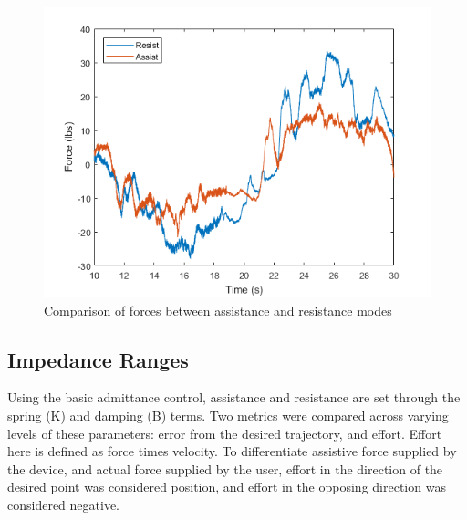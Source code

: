 \documentclass[12pt]{report}
\begin{document}
\begin{figure}[t] 
	\centering
	\includegraphics[width=0.9\linewidth]{force_comp}
	\caption{Comparison of forces between assistance and resistance modes}
	\label{fig:VerInt}
\end{figure}
	

	
	\subsection{Impedance Ranges}
	
	Using the basic admittance control, assistance and resistance are set through the spring (K) and damping (B) terms. Two metrics were compared across varying levels of these parameters: error from the desired trajectory, and effort. Effort here is defined as force times velocity. To differentiate assistive force supplied by the device, and actual force supplied by the user, effort in the direction of the desired point was considered position, and effort in the opposing direction was considered negative. 

	\setlength\arrayrulewidth{1pt}	
	
\end{document}
